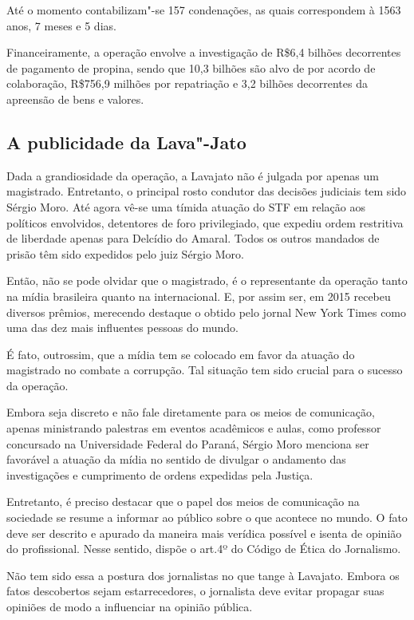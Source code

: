 {Até o momento contabilizam"-se 157 condenações, as quais correspondem à
1563 anos, 7 meses e 5 dias.

Financeiramente, a operação envolve a investigação de R\$6,4 bilhões
decorrentes de pagamento de propina, sendo que 10,3 bilhões são alvo de
por acordo de colaboração, R\$756,9 milhões por repatriação e 3,2
bilhões decorrentes da apreensão de bens e valores.

\subsection{A publicidade da Lava"-Jato}

Dada a grandiosidade da operação, a Lavajato não é julgada por apenas um
magistrado. Entretanto, o principal rosto condutor das decisões
judiciais tem sido Sérgio Moro. Até agora vê-se uma tímida atuação do
STF em relação aos políticos envolvidos, detentores de foro
privilegiado, que expediu ordem restritiva de liberdade apenas para
Delcídio do Amaral. Todos os outros mandados de prisão têm sido
expedidos pelo juiz Sérgio Moro.

Então, não se pode olvidar que o magistrado, é o representante da
operação tanto na mídia brasileira quanto na internacional. E, por assim
ser, em 2015 recebeu diversos prêmios, merecendo destaque o obtido pelo
jornal New York Times como uma das dez mais influentes pessoas do mundo.

É fato, outrossim, que a mídia tem se colocado em favor da atuação do
magistrado no combate a corrupção. Tal situação tem sido crucial para o
sucesso da operação.

Embora seja discreto e não fale diretamente para os meios de
comunicação, apenas ministrando palestras em eventos acadêmicos e aulas,
como professor concursado na Universidade Federal do Paraná, Sérgio Moro
menciona ser favorável a atuação da mídia no sentido de divulgar o
andamento das investigações e cumprimento de ordens expedidas pela
Justiça.

Entretanto, é preciso destacar que o papel dos meios de comunicação na
sociedade se resume a informar ao público sobre o que acontece no mundo.
O fato deve ser descrito e apurado da maneira mais verídica possível e
isenta de opinião do profissional. Nesse sentido, dispõe o art.4º do
Código de Ética do Jornalismo.

Não tem sido essa a postura dos jornalistas no que tange à Lavajato.
Embora os fatos descobertos sejam estarrecedores, o jornalista deve
evitar propagar suas opiniões de modo a influenciar na opinião pública.

}
